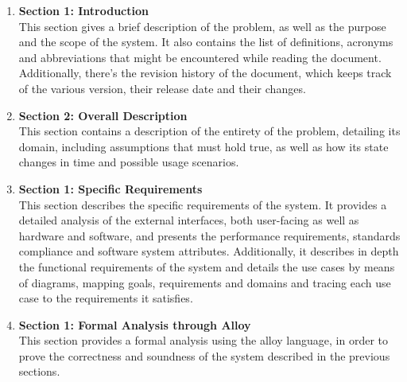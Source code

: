 \begin{enumerate}
    \item \textbf{Section 1: Introduction} \\
          This section gives a brief description of the problem, as well as the purpose and the scope of
          the system.
          It also contains the list of definitions, acronyms and abbreviations that might be encountered
          while reading the document.
          Additionally, there's the revision history of the document, which keeps track of the various
          version, their release date and their changes.
    \item \textbf{Section 2: Overall Description} \\
          This section contains a description of the entirety of the problem, detailing its domain,
          including assumptions that must hold true, as well as how its state changes in time
          and possible usage scenarios.
    \item \textbf{Section 1: Specific Requirements} \\
          This section describes the specific requirements of the system. It provides a detailed analysis
          of the external interfaces, both user-facing as well as hardware and software, and presents the
          performance requirements, standards compliance and software system attributes.
          Additionally, it describes in depth the functional requirements of the system and details the
          use cases by means of diagrams, mapping goals, requirements and domains and tracing each use
          case to the requirements it satisfies.
    \item \textbf{Section 1: Formal Analysis through Alloy} \\
          This section provides a formal analysis using the alloy language, in order
          to prove the correctness and soundness of the system described in the previous sections.
\end{enumerate}